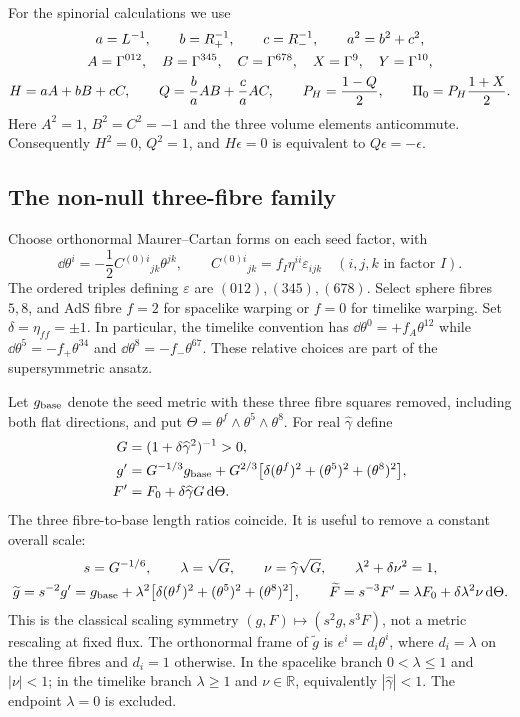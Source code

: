 For the spinorial calculations we use
\begin{gather}
a=L^{-1},\qquad b=R_+^{-1},\qquad c=R_-^{-1},\qquad a^2=b^2+c^2,\notag\\
A=\Gamma^{012},\quad B=\Gamma^{345},\quad C=\Gamma^{678},\quad
X=\Gamma^9,\quad Y=\Gamma^{10},\notag\\
H=aA+bB+cC,\qquad Q=\frac baAB+\frac caAC,\qquad
P_H=\frac{1-Q}{2},\qquad \Pi_0=P_H\frac{1+X}{2}.\label{eq:clifford-data}
\end{gather}
Here $A^2=1$, $B^2=C^2=-1$ and the three volume elements anticommute. Consequently $H^2=0$, $Q^2=1$, and $H\epsilon=0$ is equivalent to $Q\epsilon=-\epsilon$.

\subsection{The non-null three-fibre family}
Choose orthonormal Maurer--Cartan forms on each seed factor, with
\begin{equation}
\dd\theta^i=-\frac12C^{(0)i}{}_{jk}\theta^{jk},\qquad
C^{(0)i}{}_{jk}=f_I\eta^{ii}\varepsilon_{ijk}
\quad(i,j,k\text{ in factor }I).
\label{eq:mc}
\end{equation}
The ordered triples defining $\varepsilon$ are $(012),(345),(678)$. Select sphere fibres $5,8$, and AdS fibre $f=2$ for spacelike warping or $f=0$ for timelike warping. Set $\delta=\eta_{ff}=\pm1$. In particular, the timelike convention has $\dd\theta^0=+f_A\theta^{12}$ while $\dd\theta^5=-f_+\theta^{34}$ and $\dd\theta^8=-f_-\theta^{67}$. These relative choices are part of the supersymmetric ansatz.

Let $g_{\rm base}$ denote the seed metric with these three fibre squares removed, including both flat directions, and put $\Theta=\theta^f\wedge\theta^5\wedge\theta^8$. For real $\widehat\gamma$ define
\begin{align}
G&=(1+\delta\widehat\gamma^2)^{-1}>0,\notag\\
g'&=G^{-1/3}g_{\rm base}
+G^{2/3}\big[\delta(\theta^f)^2+(\theta^5)^2+(\theta^8)^2\big],\notag\\
F'&=F_0+\delta\widehat\gamma G\,\mathrm{d}\Theta.\label{eq:non-null}
\end{align}
The three fibre-to-base length ratios coincide. It is useful to remove a constant overall scale:
\begin{gather}
s=G^{-1/6},\qquad \lambda=\sqrt G,\qquad
\nu=\widehat\gamma\sqrt G,\qquad \lambda^2+\delta\nu^2=1,\notag\\
\widetilde g=s^{-2}g'=g_{\rm base}+\lambda^2
\big[\delta(\theta^f)^2+(\theta^5)^2+(\theta^8)^2\big],\qquad
\widetilde F=s^{-3}F'=\lambda F_0+\delta\lambda^2\nu\,\mathrm{d}\Theta.
\label{eq:scaled}
\end{gather}
This is the classical scaling symmetry $(g,F)\mapsto(s^2g,s^3F)$, not a metric rescaling at fixed flux. The orthonormal frame of $\widetilde g$ is $e^i=d_i\theta^i$, where $d_i=\lambda$ on the three fibres and $d_i=1$ otherwise. In the spacelike branch $0<\lambda\leq1$ and $|\nu|<1$; in the timelike branch $\lambda\geq1$ and $\nu\in\mathbb R$, equivalently $|\widehat\gamma|<1$. The endpoint $\lambda=0$ is excluded.

